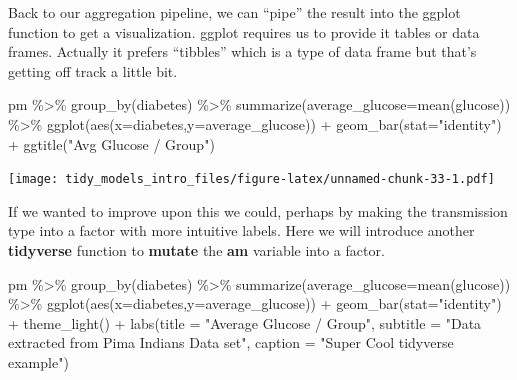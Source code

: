 \documentclass[
]{article}
\newenvironment{Shaded}{\begin{snugshade}}{\end{snugshade}}
\newcommand{\AttributeTok}[1]{\textcolor[rgb]{0.77,0.63,0.00}{#1}}
\newcommand{\FunctionTok}[1]{\textcolor[rgb]{0.00,0.00,0.00}{#1}}
\newcommand{\NormalTok}[1]{#1}
\newcommand{\SpecialCharTok}[1]{\textcolor[rgb]{0.00,0.00,0.00}{#1}}
\newcommand{\StringTok}[1]{\textcolor[rgb]{0.31,0.60,0.02}{#1}}
\begin{document}
Back to our aggregation pipeline, we can ``pipe'' the result into the
ggplot function to get a visualization. ggplot requires us to provide it
tables or data frames. Actually it prefers ``tibbles'' which is a type
of data frame but that's getting off track a little bit.

\begin{Shaded}
\begin{Highlighting}[]
\NormalTok{pm }\SpecialCharTok{\%\textgreater{}\%} 
  \FunctionTok{group\_by}\NormalTok{(diabetes) }\SpecialCharTok{\%\textgreater{}\%} 
  \FunctionTok{summarize}\NormalTok{(}\AttributeTok{average\_glucose=}\FunctionTok{mean}\NormalTok{(glucose)) }\SpecialCharTok{\%\textgreater{}\%}
  \FunctionTok{ggplot}\NormalTok{(}\FunctionTok{aes}\NormalTok{(}\AttributeTok{x=}\NormalTok{diabetes,}\AttributeTok{y=}\NormalTok{average\_glucose)) }\SpecialCharTok{+} 
    \FunctionTok{geom\_bar}\NormalTok{(}\AttributeTok{stat=}\StringTok{"identity"}\NormalTok{)  }\SpecialCharTok{+} 
    \FunctionTok{ggtitle}\NormalTok{(}\StringTok{"Avg Glucose / Group"}\NormalTok{)}
\end{Highlighting}
\end{Shaded}

\texttt{[image: tidy\_models\_intro\_files/figure-latex/unnamed-chunk-33-1.pdf]}

If we wanted to improve upon this we could, perhaps by making the
transmission type into a factor with more intuitive labels. Here we will
introduce another \textbf{tidyverse} function to \textbf{mutate} the
\textbf{am} variable into a factor.

\begin{Shaded}
\begin{Highlighting}[]
\NormalTok{pm }\SpecialCharTok{\%\textgreater{}\%} 
  \FunctionTok{group\_by}\NormalTok{(diabetes) }\SpecialCharTok{\%\textgreater{}\%} 
  \FunctionTok{summarize}\NormalTok{(}\AttributeTok{average\_glucose=}\FunctionTok{mean}\NormalTok{(glucose)) }\SpecialCharTok{\%\textgreater{}\%}
  \FunctionTok{ggplot}\NormalTok{(}\FunctionTok{aes}\NormalTok{(}\AttributeTok{x=}\NormalTok{diabetes,}\AttributeTok{y=}\NormalTok{average\_glucose)) }\SpecialCharTok{+} 
    \FunctionTok{geom\_bar}\NormalTok{(}\AttributeTok{stat=}\StringTok{"identity"}\NormalTok{)  }\SpecialCharTok{+} 
    \FunctionTok{theme\_light}\NormalTok{() }\SpecialCharTok{+} 
    \FunctionTok{labs}\NormalTok{(}\AttributeTok{title =} \StringTok{"Average Glucose / Group"}\NormalTok{, }
         \AttributeTok{subtitle =} \StringTok{"Data extracted from Pima Indians Data set"}\NormalTok{, }
         \AttributeTok{caption =} \StringTok{"Super Cool tidyverse example"}\NormalTok{)}
\end{Highlighting}
\end{Shaded}
\end{document}
